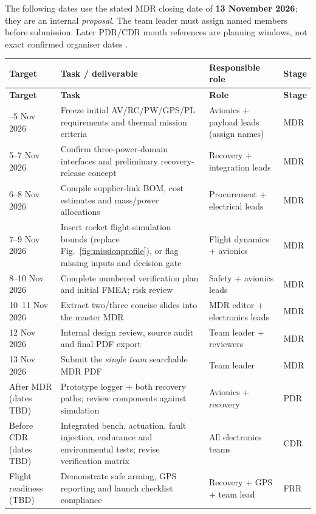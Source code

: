 The following dates use the stated MDR closing date of \textbf{13 November 2026}; they are an internal \emph{proposal}. The team leader must assign named members before submission. Later PDR/CDR month references are planning windows, not exact confirmed organiser dates \cite{rtc2027app01,rtc2027app07}.

\small
{}
\begin{longtable}{@{}L{27mm}L{63mm}L{38mm}L{23mm}@{}}
\toprule{}\textbf{Target}&\textbf{Task / deliverable}&\textbf{Responsible role}&\textbf{Stage}\\\midrule\endfirsthead
\toprule{}\textbf{Target}&\textbf{Task}&\textbf{Role}&\textbf{Stage}\\\midrule\endhead
\bottomrule{}--5 Nov 2026 & Freeze initial AV/RC/PW/GPS/PL requirements and thermal mission criteria & Avionics + payload leads (assign names) & MDR\\
5--7 Nov 2026 & Confirm three-power-domain interfaces and preliminary recovery-release concept & Recovery + integration leads & MDR\\
6--8 Nov 2026 & Compile supplier-link BOM, cost estimates and mass/power allocations & Procurement + electrical leads & MDR\\
7--9 Nov 2026 & Insert rocket flight-simulation bounds (replace Fig.~\ref{fig:missionprofile}), or flag missing inputs and decision gate & Flight dynamics + avionics & MDR\\
8--10 Nov 2026 & Complete numbered verification plan and initial FMEA; risk review & Safety + avionics leads & MDR\\
10--11 Nov 2026 & Extract two/three concise slides into the master MDR & MDR editor + electronics leads & MDR\\
12 Nov 2026 & Internal design review, source audit and final PDF export & Team leader + reviewers & MDR\\
13 Nov 2026 & Submit the \emph{single team} searchable MDR PDF & Team leader & MDR\\
After MDR (dates TBD) & Prototype logger + both recovery paths; review components against simulation & Avionics + recovery & PDR\\
Before CDR (dates TBD) & Integrated bench, actuation, fault injection, endurance and environmental tests; revise verification matrix & All electronics teams & CDR\\
Flight readiness (TBD) & Demonstrate safe arming, GPS reporting and launch checklist compliance & Recovery + GPS + team lead & FRR\\
\end{longtable}
\normalsize

